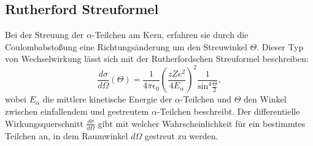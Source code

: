 \documentclass{article}
\begin{document}
\subsection{Rutherford Streuformel}
Bei der Streuung der $\alpha$-Teilchen am Kern, erfahren sie durch die Coulombabstoßung eine Richtungsänderung um den Streuwinkel $\Theta$. Dieser Typ von Wechselwirkung lässt sich mit der Rutherfordschen Streuformel beschreiben:
\begin{equation}
\frac{d\sigma}{d\Omega}(\Theta) = \frac{1}{4 \pi \epsilon_0} \left(\frac{z Z e^2}{4 E_\alpha}\right)^2 \frac{1}{\text{sin}^4 \frac{\Theta}{2}},
\end{equation}
wobei $E_\alpha$ die mittlere kinetische Energie der $\alpha$-Teilchen und $\Theta$ den Winkel zwischen einfallendem und gestreutem $\alpha$-Teilchen beschreibt. Der differentielle Wirkungsquerschnitt $\frac{d\sigma}{d\Omega}$ gibt mit welcher Wahrscheinlichkeit für ein bestimmtes Teilchen an, in dem Raumwinkel $d\Omega$ gestreut zu werden.
\end{document}
